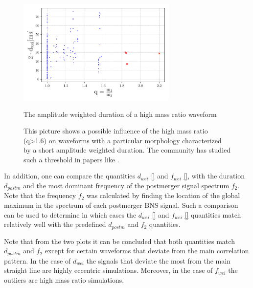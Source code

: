 \begin{figure}[hbt!]
\begin{center}
\includegraphics[width=0.7\textwidth, angle=0]{images/Data_analysis/results/Mr.pdf}
\captionsetup{width=0.8\textwidth}
\caption{The amplitude weighted duration of a high mass ratio waveform}
\caption*{This picture shows a possible influence of the high mass ratio (q>1.6) on waveforms with a particular morphology characterized by a  short amplitude weighted duration. The community has studied such a threshold in papers like \cite{Kolsch:2021lub}.}
\label{High mass ratio}
\end{center}
\end{figure}
\FloatBarrier


In addition, one can compare the quantities $d_{wei}$ \ref{} and $f_{wei}$ \ref{}, with the duration $d_{postm}$ and the most dominant frequency of the postmerger signal spectrum $f_2$. Note that the frequency $f_2$ was calculated by finding the location of the global maximum in the spectrum of each postmerger BNS signal. Such a comparison can be used to determine in which cases the $d_{wei}$ \ref{} and $f_{wei}$ \ref{} quantities match relatively well with the predefined $d_{postm}$ and $f_2$ quantities.

Note that from the two plots it can be concluded that both quantities match $d_{postm}$ and $f_2$ except for certain waveforms that deviate from the main correlation pattern. In the case of $d_{wei}$ the signals that deviate the most from the main straight line are highly eccentric simulations. Moreover, in the case of $f_{wei}$ the outliers are high mass ratio simulations.

